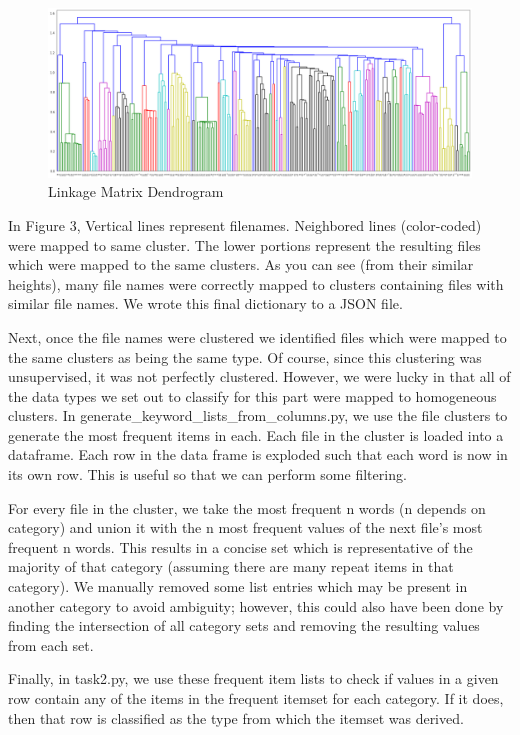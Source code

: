 \documentclass[sigconf,authordraft]{acmart}
\begin{document}
\begin{figure}[h]
  \centering
  \includegraphics[width=\linewidth]{dendrogram.png}
  \caption{Linkage Matrix Dendrogram}
\end{figure}

In Figure 3, Vertical lines represent filenames. Neighbored lines (color-coded) were mapped to same cluster. The lower portions represent the resulting files which were mapped to the same clusters. As you can see (from their similar heights), many file names were correctly mapped to clusters containing files with similar file names. We wrote this final dictionary to a JSON file.

Next, once the file names were clustered we identified files which were mapped to the same clusters as being the same type. Of course, since this clustering was unsupervised, it was not perfectly clustered. However, we were lucky in that all of the data types we set out to classify for this part were mapped to homogeneous clusters. In generate\_keyword\_lists\_from\_columns.py, we use the file clusters to generate the most frequent items in each. Each file in the cluster is loaded into a dataframe. Each row in the data frame is exploded such that each word is now in its own row. This is useful so that we can perform some filtering.

For every file in the cluster, we take the most frequent n words (n depends on category) and union it with the n most frequent values of the next file’s most frequent n words. This results in a concise set which is representative of the majority of that category (assuming there are many repeat items in that category). We manually removed some list entries which may be present in another category to avoid ambiguity; however, this could also have been done by finding the intersection of all category sets and removing the resulting values from each set.
 
Finally, in task2.py, we use these frequent item lists to check if values in a given row contain any of the items in the frequent itemset for each category. If it does, then that row is classified as the type from which the itemset was derived.
\end{document}
